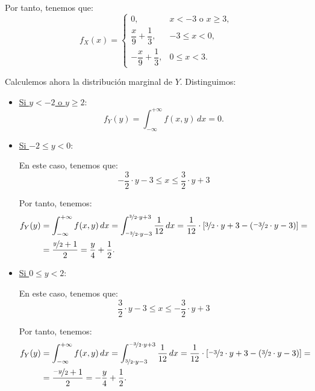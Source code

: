 \begin{ejercicio}
    Por tanto, tenemos que:
    \begin{equation*}
        f_X(x) = \begin{cases}
            0, & x<-3 \text{ o } x\geq 3, \\
            \dfrac{x}{9} + \dfrac{1}{3}, & -3\leq x<0, \\
            -\dfrac{x}{9} + \dfrac{1}{3}, & 0\leq x<3.
        \end{cases}
    \end{equation*}

    Calculemos ahora la distribución marginal de $Y$. Distinguimos:
    \begin{itemize}
        \item \ul{Si $y<-2$ o $y\geq 2$}:
        \begin{equation*}
            f_Y(y) = \int_{-\infty}^{+\infty} f(x, y) \, dx = 0.
        \end{equation*}

        \item \ul{Si $-2\leq y<0$}:
    
        En este caso, tenemos que:
        \begin{equation*}
            -\frac{3}{2}\cdot y-3 \leq x \leq \frac{3}{2}\cdot y+3
        \end{equation*}

        Por tanto, tenemos:
        \begin{align*}
            f_Y(y) &= \int_{-\infty}^{+\infty} f(x, y) \, dx =
            \int_{\nicefrac{-3}{2}\cdot y-3}^{\nicefrac{3}{2}\cdot y+3} \frac{1}{12} \, dx = \frac{1}{12}\cdot \left[\nicefrac{3}{2}\cdot y+3-\left(\nicefrac{-3}{2}\cdot y-3\right)\right] =\\
            &= \dfrac{\nicefrac{y}{2}+1}{2} = \dfrac{y}{4} + \dfrac{1}{2}.
        \end{align*}

        \item \ul{Si $0\leq y<2$}:
        
        En este caso, tenemos que:
        \begin{equation*}
            \frac{3}{2}\cdot y-3 \leq x \leq -\frac{3}{2}\cdot y+3
        \end{equation*}

        Por tanto, tenemos:
        \begin{align*}
            f_Y(y) &= \int_{-\infty}^{+\infty} f(x, y) \, dx =
            \int_{\nicefrac{3}{2}\cdot y-3}^{\nicefrac{-3}{2}\cdot y+3} \frac{1}{12} \, dx = \frac{1}{12}\cdot \left[\nicefrac{-3}{2}\cdot y+3-\left(\nicefrac{3}{2}\cdot y-3\right)\right] =\\
            &= \dfrac{\nicefrac{-y}{2}+1}{2} = -\dfrac{y}{4} + \dfrac{1}{2}.
        \end{align*}
    \end{itemize}


\end{ejercicio}
